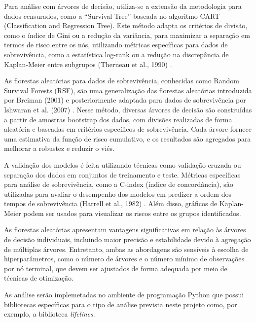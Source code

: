 Para análise com árvores de decisão, utiliza-se a extensão da metodologia para dados censurados, como a ``Survival Tree'' baseada no algoritmo CART (Classification and Regression Tree). Este método adapta os critérios de divisão, como o índice de Gini ou a redução da variância, para maximizar a separação em termos de risco entre os nós, utilizando métricas específicas para dados de sobrevivência, como a estatística log-rank ou a redução na discrepância de Kaplan-Meier entre subgrupos (Therneau et al., 1990) \cite{therneau1990martingale}.

As florestas aleatórias para dados de sobrevivência, conhecidas como Random Survival Forests (RSF), são uma generalização das florestas aleatórias introduzida por Breiman (2001) \cite{breiman2001random} e posteriormente adaptada para dados de sobrevivência por Ishwaran et al. (2007) \cite{ishwaran2007random}. Nesse método, diversas árvores de decisão são construídas a partir de amostras bootstrap dos dados, com divisões realizadas de forma aleatória e baseadas em critérios específicos de sobrevivência. Cada árvore fornece uma estimativa da função de risco cumulativo, e os resultados são agregados para melhorar a robustez e reduzir o viés.

A validação dos modelos é feita utilizando técnicas como validação cruzada ou separação dos dados em conjuntos de treinamento e teste. Métricas específicas para análise de sobrevivência, como a C-index (índice de concordância), são utilizadas para avaliar o desempenho dos modelos em predizer a ordem dos tempos de sobrevivência (Harrell et al., 1982) \cite{harrell1982evaluating}. Além disso, gráficos de Kaplan-Meier podem ser usados para visualizar os riscos entre os grupos identificados.

As florestas aleatórias apresentam vantagens significativas em relação às árvores de decisão individuais, incluindo maior precisão e estabilidade devido à agregação de múltiplas árvores. Entretanto, ambas as abordagens são sensíveis à escolha de hiperparâmetros, como o número de árvores e o número mínimo de observações por nó terminal, que devem ser ajustados de forma adequada por meio de técnicas de otimização.







As análise serão implemetadas no ambiente de programação  Python que possui bibliotecas específicas para o tipo de análise prevista neste projeto como, por exemplo, a biblioteca \textit{lifelines}.


